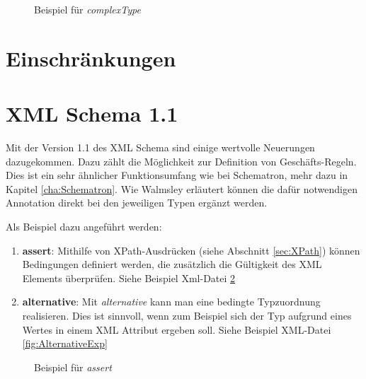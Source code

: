 \begin{figure}
\centering
{}
    
\caption{Beispiel für \emph{complexType}  
}
\label{fig:complexTypeExp}
\end{figure}

\section{Einschränkungen}

\section{XML Schema 1.1}
Mit der Version 1.1 des XML Schema sind einige wertvolle Neuerungen dazugekommen. Dazu zählt die Möglichkeit zur Definition von Geschäfts-Regeln. Dies ist ein sehr ähnlicher Funktionsumfang wie bei Schematron, mehr dazu in Kapitel  \ref{cha:Schematron}.
Wie Walmsley \cite{Walmsley} erläutert können die dafür notwendigen Annotation direkt bei den jeweiligen Typen ergänzt werden.

Als Beispiel dazu angeführt werden:
\begin{enumerate}
\item \textbf{assert}: Mithilfe von XPath-Ausdrücken (siehe Abschnitt \ref{sec:XPath}) können Bedingungen definiert werden, die zusätzlich die Gültigkeit des XML Elements überprüfen. Siehe Beispiel Xml-Datei \ref{fig:AssertExp}
\item \textbf{alternative}: Mit \emph{alternative} kann man eine bedingte Typzuordnung realisieren. Dies ist sinnvoll, wenn zum Beispiel sich der Typ aufgrund eines Wertes in einem XML Attribut ergeben soll. Siehe Beispiel XML-Datei \ref{fig:AlternativeExp}
\end{enumerate}

\begin{figure}
\centering
{}
    
\caption{Beispiel für \emph{assert}  
}
\label{fig:AssertExp}
\end{figure}


